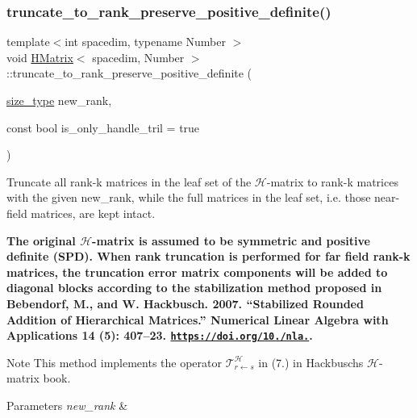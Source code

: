 \mbox{\label{classHMatrix_a938473855f9e95358d00ee7ea14f6c51}} 
\subsubsection{\texorpdfstring{truncate\+\_\+to\+\_\+rank\+\_\+preserve\+\_\+positive\+\_\+definite()}{truncate\_to\_rank\_preserve\_positive\_definite()}}
{\footnotesize\ttfamily template$<$int spacedim, typename Number $>$ \\
void \hyperlink{classHMatrix}{H\+Matrix}$<$ spacedim, Number $>$\+::truncate\+\_\+to\+\_\+rank\+\_\+preserve\+\_\+positive\+\_\+definite (\begin{DoxyParamCaption}\item[{\hyperlink{classHMatrix_a5ca8dc549783d38371a01ecd621ecb34}{size\+\_\+type}}]{new\+\_\+rank,  }\item[{const bool}]{is\+\_\+only\+\_\+handle\+\_\+tril = {\ttfamily true} }\end{DoxyParamCaption})}

Truncate all rank-\/k matrices in the leaf set of the $\mathcal{H}$-\/matrix to rank-\/k matrices with the given {\ttfamily new\+\_\+rank}, while the full matrices in the leaf set, i.\+e. those near-\/field matrices, are kept intact.

{\bfseries The original $\mathcal{H}$-\/matrix is assumed to be symmetric and positive definite (S\+PD). When rank truncation is performed for far field rank-\/k matrices, the truncation error matrix components will be added to diagonal blocks according to the stabilization method proposed in Bebendorf, M., and W. Hackbusch. 2007. “\+Stabilized Rounded Addition of Hierarchical Matrices.\+” Numerical Linear Algebra with Applications 14 (5)\+: 407–23. \href{https://doi.org/10.1002/nla.525}{\tt https\+://doi.\+org/10./nla.}.}


\begin{DoxyDescription}
\item[Note ]This method implements the operator $\mathcal{T}_{r \leftarrow s}^{\mathcal{H}}$ in (7.) in Hackbusch\textquotesingle{}s $\mathcal{H}$-\/matrix book. 
\end{DoxyDescription}
\begin{DoxyParams}{Parameters}
{\em new\+\_\+rank} & \\
\hline
\end{DoxyParams}


